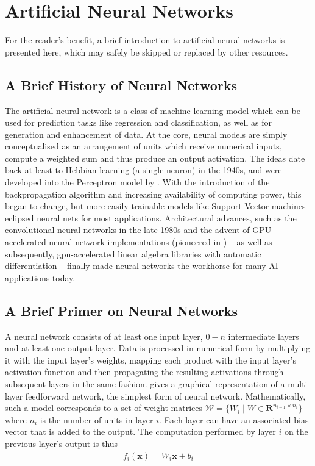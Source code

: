 \hypertarget{sec:anns}{%
\section{Artificial Neural Networks}\label{sec:anns}}

For the reader's benefit, a brief introduction to artificial neural networks is
presented here, which may safely be skipped or replaced by other resources.

\subsection*{A Brief History of Neural Networks}%

The artificial neural network is a class of machine learning model which can be
used for prediction tasks like regression and classification, as well as for
generation and enhancement of data.  At
the core, neural models are simply conceptualised as an arrangement of units
which receive numerical inputs, compute a weighted sum and thus produce an output
activation. The ideas date back at least to Hebbian learning (a single neuron)
in the 1940s, and were developed into the Perceptron model by
\citet{Rosenblatt58theperceptron}. With the introduction of the backpropagation
algorithm \citep{werbos1975beyond} and increasing availability of computing
power, this began to change, but more easily trainable models like Support
Vector machines eclipsed neural nets for most applications.  Architectural
advances, such as the convolutional neural networks in the late 1980s
\citep{LeCun:1989:BAH:1351079.1351090} and the advent of GPU-accelerated neural
network implementations (pioneered in \cite{Ciresan11flexible}) -- as well as
subsequently, gpu-accelerated linear algebra libraries with automatic
differentiation -- finally made neural networks the workhorse for many AI
applications today.

\subsection*{A Brief Primer on Neural Networks}%

A neural network consists of at least one input layer, \(0-n\)
intermediate layers and at least one output layer. Data is processed in
numerical form by multiplying it with the input layer's weights, mapping
each product with the input layer's activation function and then
propagating the resulting activations through subsequent layers in the
same fashion.  gives a graphical representation of a
multi-layer feedforward network, the simplest form of neural network.
Mathematically, such a model corresponds to a set of weight matrices
$\mathcal{W} = \{W_i \mid W \in \mathbf{R}^{n_{i-1} \times n_i}\}$ where $n_i$
is the number of units in layer $i$. Each layer can have an associated bias
vector that is added to the output. The computation performed by layer $i$ on
the previous layer's output is
thus
\begin{align}
    f_i(\mathbf{x}) = W_i \mathbf{x} + b_i
\end{align}


